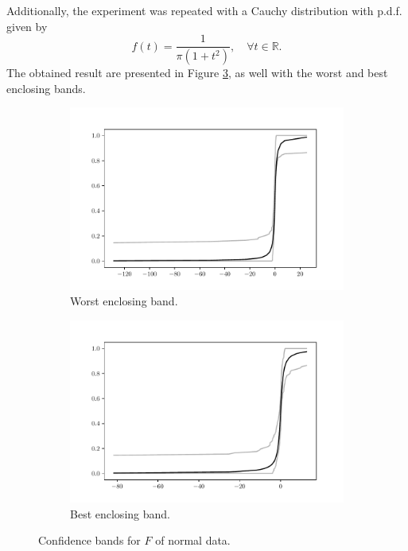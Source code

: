 \documentclass[11pt]{article}
\theoremstyle{definition}
\theoremstyle{remark}
\theoremstyle{remark}
\begin{document}
Additionally, the experiment was repeated with a Cauchy distribution
with p.d.f. given by
\[
  f(t)=\dfrac{1}{\pi(1+t^2)},\quad\forall t\in\mathbb{R}.
\]
The obtained result are presented in Figure \ref{fig:bands_cauchy}, as
well with the worst and best enclosing bands.
\begin{figure}[H]
  \centering
  \begin{subfigure}[t]{0.475\textwidth}
      \centering
      \includegraphics[scale=0.45]{../figs/min_cauchy_bands.pdf}
      \caption{Worst enclosing band.}
      \label{subfig:worst_band_cauchy}
  \end{subfigure}
  \begin{subfigure}[t]{0.475\textwidth}
      \centering
      \includegraphics[scale=0.45]{../figs/max_cauchy_bands.pdf}
      \caption{Best enclosing band.}
      \label{subfig:best_band_cauchy}
  \end{subfigure}
  \caption{Confidence bands for $F$ of normal data.}
  \label{fig:bands_cauchy}
\end{figure}
\end{document}
